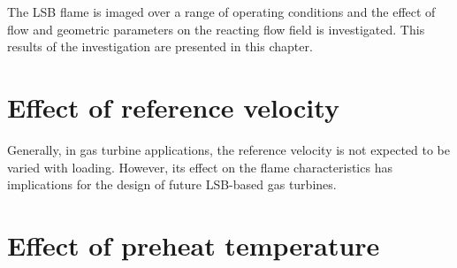 The LSB flame is imaged over a range of operating conditions and the effect of flow and geometric parameters on the reacting flow field is investigated.
This results of the investigation are presented in this chapter.

\section{Effect of reference velocity}

Generally, in gas turbine applications, the reference velocity is not expected to be varied with loading.
However, its effect on the flame characteristics has implications for the design of future LSB-based gas turbines.


\section{Effect of preheat temperature}

